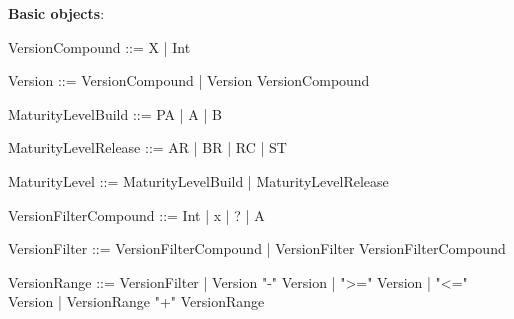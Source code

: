 \documentclass[11pt]{article}
\newcommand{\prog}[1]{{\small\texttt{#1}}}
\begin{document}
\textbf{Basic objects}:
\begin{program}
VersionCompound ::= X
				 | Int
\end{program}
\begin{program}
Version ::= VersionCompound
		 | Version VersionCompound
\end{program}		 
\begin{program}
MaturityLevelBuild ::= PA
				    |  A
				    |  B		 
\end{program}			
\begin{program}	    
MaturityLevelRelease ::= AR
				    |  BR
				    |  RC
				    |  ST	
\end{program}	
\begin{program}			    
MaturityLevel ::= MaturityLevelBuild
				| MaturityLevelRelease	 
\end{program}	
\begin{program}			
VersionFilterCompound ::= Int
						| x
						| ?
						| A
\end{program}
\begin{program}							
VersionFilter ::= VersionFilterCompound
			   | VersionFilter VersionFilterCompound
\end{program}
\begin{program}			   
VersionRange ::= VersionFilter
			  |  Version "-" Version
			  | ">=" Version
 			  | "<=" Version
 			  | VersionRange "+" VersionRange
\end{program}				    
%

%

%
\end{document}
